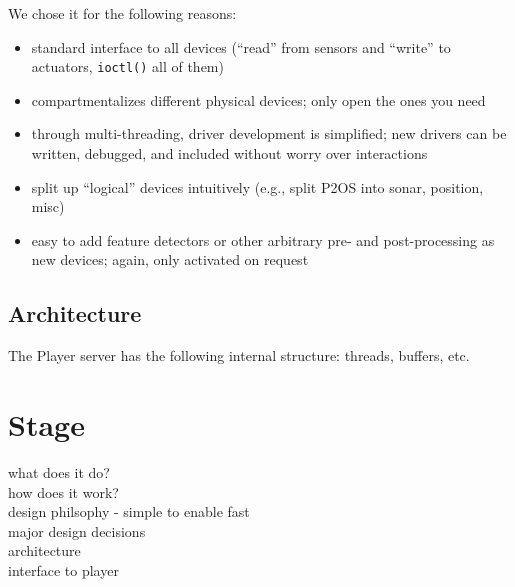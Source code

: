 \documentclass[]{article}
\begin{document}
\noindent We chose it for the following reasons:
\begin{itemize}
\item standard interface to all devices (``read'' from sensors and ``write''
to actuators, {\tt ioctl()} all of them)
\item compartmentalizes different physical devices; only open the ones
you need
\item through multi-threading, driver development is simplified; new
drivers can be written, debugged, and included without worry over 
interactions
\item split up ``logical'' devices intuitively (e.g., split P2OS into
sonar, position, misc)
\item easy to add feature detectors or other arbitrary pre- and
post-processing as new devices; again, only activated on request
\end{itemize}


\subsection{Architecture}
\label{architecture}
The Player server has the following internal structure: threads, buffers, etc.






\section{Stage}

what does it do?\\
how does it work?\\
design philsophy  - simple to enable fast\\
major design decisions\\
architecture\\
interface to player\\
\end{document}
